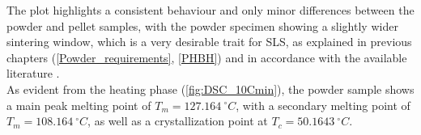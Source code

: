 \documentclass{article}
\begin{document}
%
%
%

        \clearpage
        The plot highlights a consistent behaviour  and only 
        minor differences between the powder and pellet samples, with the powder specimen showing a slightly wider 
        sintering window, which is a very desirable trait for SLS, as explained in 
        previous chapters (\ref{Powder_requirements}, \ref{PHBH}) and in accordance with 
        the available literature \autocites{Eraslan_PHBH_review,doi:10.1063/1.4918516,DechetMaximilianA2020OtDo}. \\    
        
        As evident from the heating phase (\ref{fig:DSC_10Cmin}), the powder sample shows a main peak melting point of $T_{m} =  127.164 \ ^{\circ}C$, with 
        a secondary melting point of $T_{m} =  108.164 \ ^{\circ}C$, as well as a crystallization point at $T_{c} =  50.1643 \ ^{\circ}C$. 
\end{document}
